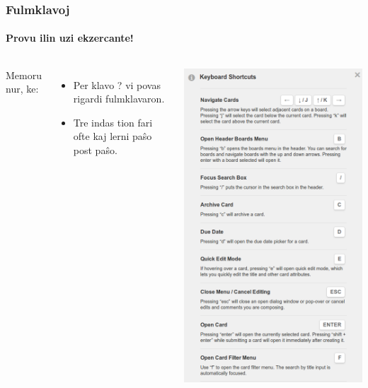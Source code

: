   \begin{frame}
    \frametitle{Fulmklavoj}
    \framesubtitle{Provu ilin uzi ekzercante!}
    
    \begin{columns}
	
	Memoru nur, ke:    
    
	\begin{itemize}
		\item Per klavo ? vi povas rigardi fulmklavaron.
		\item Tre indas tion fari ofte kaj lerni paŝo post paŝo.
	\end{itemize}
    
    	
    
    \includegraphics[scale=0.2]{ekranoj/fulmklavaro}
	
	\end{columns}
	
	
  \end{frame}
